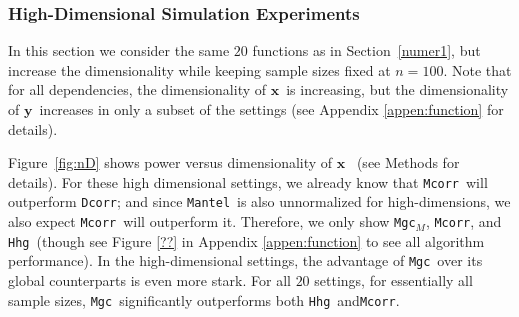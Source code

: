 \documentclass[11pt]{article}
\newcommand{\note}[2][]{\added[#1,remark={#2}]{}}
\providecommand{\sct}[1]{{\sc \texttt{#1}}}
\providecommand{\mb}[1]{\boldsymbol{#1}}
\newcommand{\Mgc}{\sct{Mgc}}
\newcommand{\Mgcm}{\sct{Mgc$_M$}}
\newcommand{\Hhg}{\sct{Hhg}}
\newcommand{\Dcorr}{\sct{Dcorr}}
\newcommand{\Mcorr}{\sct{Mcorr}}
\newcommand{\Mantel}{\sct{Mantel}}
\newcommand{\cs}[1]{{\note{cs: #1}}}
\newcommand{\mbx}{\ensuremath{\mb{x}}}
\newcommand{\mby}{\ensuremath{\mb{y}}}
\begin{document}
\subsubsection{High-Dimensional Simulation Experiments}
\label{numer2}

In this section we consider the same $20$ functions as in Section~\ref{numer1}, but increase the dimensionality while keeping sample sizes fixed  at $n=100$. 
Note that for all dependencies, the dimensionality of \mbx~is increasing, but the dimensionality of \mby~increases in only a subset of the settings (see Appendix \ref{appen:function} for details).

Figure~\ref{fig:nD} shows power versus dimensionality of \mbx~
\cs{put in appendix and caption: for a significance value of $\alpha=0.05$} 
(see Methods for details).  
For these high dimensional settings, we already know that \Mcorr~will outperform \Dcorr; and since \Mantel~is also unnormalized for high-dimensions, we also expect \Mcorr~will outperform it.  Therefore, we only show \Mgcm, \Mcorr, and \Hhg~(though see Figure \ref{??} in Appendix \ref{appen:function} to see all algorithm performance).
In the high-dimensional settings, the advantage of \Mgc~over its global counterparts is even more stark. For all $20$ settings, for essentially all sample sizes, \Mgc~significantly outperforms both \Hhg~and\Mcorr.

\end{document}
